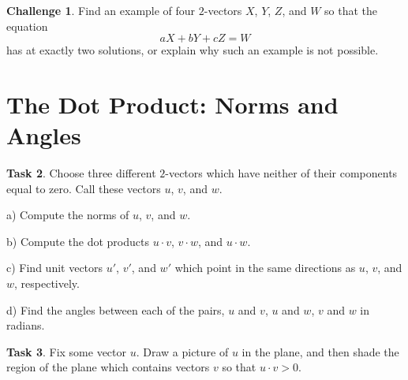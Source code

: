 \documentclass{tufte-book}
\theoremstyle{definition}
\newtheorem{task}{Task}
\newtheorem{challenge}[task]{Challenge}
\begin{document}
\begin{challenge}
Find an example of four $2$-vectors $X$, $Y$, $Z$, and $W$ so that the equation
\[
aX+bY+cZ = W
\]
has at exactly two solutions, or explain why such an example is not possible.
\end{challenge}

\section*{The Dot Product: Norms and Angles}

\begin{task}
Choose three different $2$-vectors which have neither of their components equal to zero. Call these vectors $u$, $v$, and $w$.
\begin{compactitem}
\item[a)] Compute the norms of $u$, $v$, and $w$.
\item[b)] Compute the dot products $u\cdot v$, $v\cdot w$, and $u\cdot w$.
\item[c)] Find unit vectors $u'$, $v'$, and $w'$ which point in the same directions as $u$, $v$, and $w$, respectively.
\item[d)] Find the angles between each of the pairs, $u$ and $v$, $u$ and $w$, $v$ and $w$ in radians.
\end{compactitem}
\end{task}



\begin{task}
Fix some vector $u$. Draw a picture of $u$ in the plane, and then shade the region of the plane which contains vectors $v$ so that $u\cdot v> 0$.
\end{task}
\end{document}
